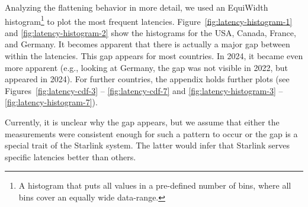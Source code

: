 Analyzing the flattening behavior in more detail, we used an EquiWidth
histogram\footnote{A histogram that puts all values in a pre-defined number of
	bins, where all bins cover an equally wide data-range.} to plot the
most frequent latencies. Figure~\ref{fig:latency-histogram-1} and
\ref{fig:latency-histogram-2} show the histograms for the USA, Canada, France,
and Germany. It becomes apparent that there is actually a major gap between
within the latencies. This gap appears for most countries. In 2024, it became
even more apparent (e.g., looking at Germany, the gap was not visible in 2022,
but appeared in 2024). For further countries, the appendix holds further plots
(see Figures~\ref{fig:latency-cdf-3} -- \ref{fig:latency-cdf-7} and
\ref{fig:latency-histogram-3} -- \ref{fig:latency-histogram-7}).

Currently, it is unclear why the gap appears, but we assume that either
the measurements were consistent enough for such a pattern to occur or the gap
is a special trait of the Starlink system. The latter would infer that Starlink
serves specific latencies better than others.

